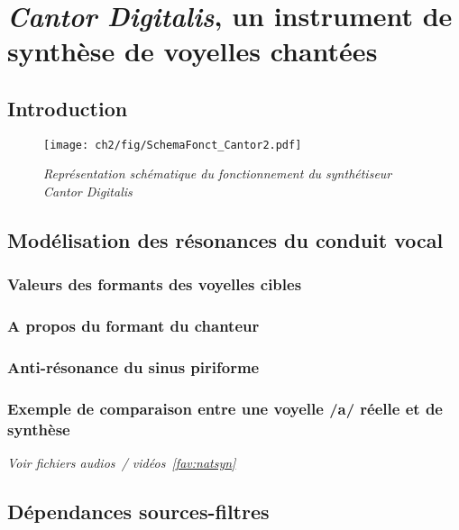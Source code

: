 \chapter{\textit{Cantor Digitalis}, un instrument de synthèse de voyelles chantées}
\label{Sec:CantorDigitalis}
\minitoc
\cleardoublepage

\section{Introduction}
\lipsum[1-2]

\begin{figure}
  \centering
  {\texttt{[image: ch2/fig/SchemaFonct\_Cantor2.pdf]}}
    \caption{{\it Représentation schématique du fonctionnement du synthétiseur Cantor Digitalis}}
  \label{Fig:SchemaFonct_Cantor}
  \hspace{0.3cm}
\end{figure}

\section{Modélisation des résonances du conduit vocal}
\lipsum[1-2]

\subsection{Valeurs des formants des voyelles cibles}
\label{Sec:formantsCibles}
\lipsum[1-1]

\subsection{A propos du formant du chanteur}
\lipsum[1-1]
	
\subsection{Anti-résonance du sinus piriforme}
\lipsum[1-1]

\subsection{Exemple de comparaison entre une voyelle /a/ réelle et de synthèse}
\label{sec:cantor-example-voyelle}
\noindent \textit{Voir fichiers audios~/ vidéos~\ref{fav:natsyn}}\\
\lipsum[1-1]

\section{Dépendances sources-filtres}
\label{Sec:interactionSF}

